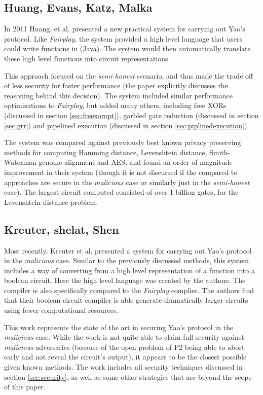 \subsection{Huang, Evans, Katz, Malka}

In 2011 Huang, et al. presented a new practical system for carrying out Yao's protocol.  Like \emph{Fairplay}, the system provided a high level language that users could write functions in (Java).  The system would then automatically translate these high level functions into circuit representations.

This approach focused on the \emph{semi-honest} scenario, and thus made the trade off of less security for faster performance (the paper explicitly discusses the reasoning behind this decision). The system included similar performance optimizations to \emph{Fairplay}, but added many others, including free XORs (discussed in section \ref{sec:freexoropt}), garbled gate reduction (discussed in section \ref{sec:grr}) and pipelined execution (discussed in section \ref{sec:piplinedexecution}).

The system was compared against previously best known privacy preserving methods for computing Hamming distance, Levenshtein distance, Smith-Waterman genome alignment and AES, and found an order of magnitude improvement in their system (though it is not discussed if the compared to approaches are secure in the \emph{malicious} case or similarly just in the \emph{semi-honest} case). The largest circuit computed consisted of over 1 billion gates, for the Levenshtein distance problem.


\subsection{Kreuter, shelat, Shen}

Most recently, Kreuter et al.\cite{kreuter2012billion} presented a system for carrying out Yao's protocol in the \emph{malicious} case.  Similar to the previously discussed methods, this system includes a way of converting from a high level representation of a function into a boolean circuit.  Here the high level language was created by the authors. The compiler is also specifically compared to the \emph{Fairplay} complier.  The authors find that their boolean circuit compiler is able generate dramatically larger circuits using fewer computational resources.

This work represents the state of the art in securing Yao's protocol in the \emph{malicious} case.  While the work is not quite able to claim full security against \emph{malicious} adversaries (because of the open problem of \ac{P2} being able to abort early and not reveal the circuit's output), it appears to be the closest possible given known methods.  The work includes all security techniques discussed in section \ref{sec:security}, as well as some other strategies that are beyond the scope of this paper.

